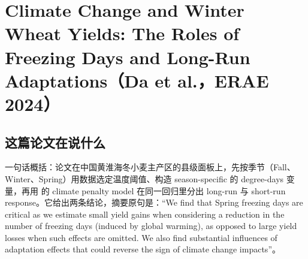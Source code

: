 
\chapter[Application 1：Climate Change and Winter Wheat Yields: The Roles of Freezing Days and Long-Run Adaptations（Da et al.，ERAE 2024）]{Climate Change and Winter Wheat Yields: The Roles of Freezing Days and Long-Run Adaptations（Da et al.，ERAE 2024）}
\label{ch:da-et-al-2024}

\section{这篇论文在说什么}

一句话概括：论文在中国黄淮海冬小麦主产区的县级面板上，先按季节（Fall、Winter、Spring）用数据选定温度阈值、构造 season-specific 的 degree-days 变量，再用  的 climate penalty model 在同一回归里分出 long-run 与 short-run response。它给出两条结论，摘要原句是：``We find that Spring freezing days are critical as we estimate small yield gains when considering a reduction in the number of freezing days (induced by global warming), as opposed to large yield losses when such effects are omitted. We also find substantial influences of adaptation effects that could reverse the sign of climate change impacts''\citep[第~815 页]{da2024climate}。

